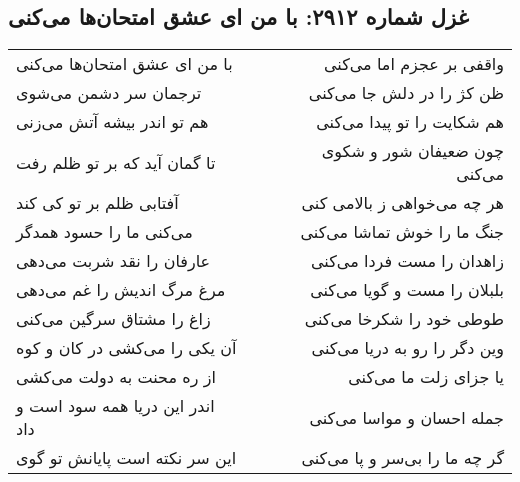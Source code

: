 \begin{center}
\section*{غزل شماره ۲۹۱۲: با من ای عشق امتحان‌ها می‌کنی}
\label{sec:2912}
\begin{longtable}{l p{0.5cm} r}
با من ای عشق امتحان‌ها می‌کنی
&&
واقفی بر عجزم اما می‌کنی
\\
ترجمان سر دشمن می‌شوی
&&
ظن کژ را در دلش جا می‌کنی
\\
هم تو اندر بیشه آتش می‌زنی
&&
هم شکایت را تو پیدا می‌کنی
\\
تا گمان آید که بر تو ظلم رفت
&&
چون ضعیفان شور و شکوی می‌کنی
\\
آفتابی ظلم بر تو کی کند
&&
هر چه می‌خواهی ز بالامی کنی
\\
می‌کنی ما را حسود همدگر
&&
جنگ ما را خوش تماشا می‌کنی
\\
عارفان را نقد شربت می‌دهی
&&
زاهدان را مست فردا می‌کنی
\\
مرغ مرگ اندیش را غم می‌دهی
&&
بلبلان را مست و گویا می‌کنی
\\
زاغ را مشتاق سرگین می‌کنی
&&
طوطی خود را شکرخا می‌کنی
\\
آن یکی را می‌کشی در کان و کوه
&&
وین دگر را رو به دریا می‌کنی
\\
از ره محنت به دولت می‌کشی
&&
یا جزای زلت ما می‌کنی
\\
اندر این دریا همه سود است و داد
&&
جمله احسان و مواسا می‌کنی
\\
این سر نکته است پایانش تو گوی
&&
گر چه ما را بی‌سر و پا می‌کنی
\\
\end{longtable}
\end{center}

